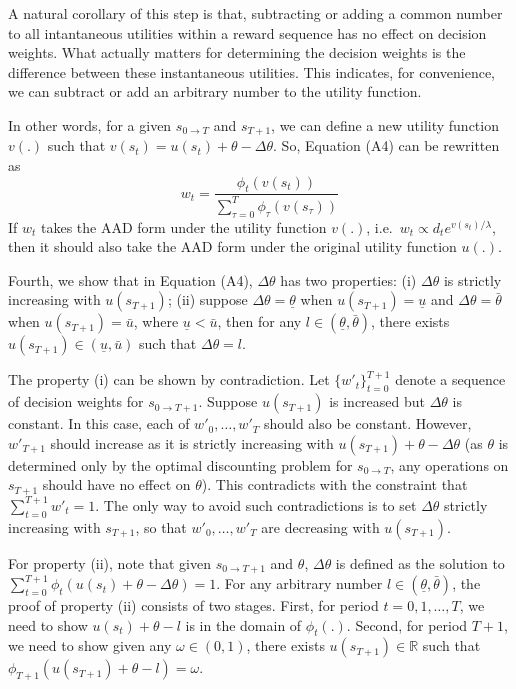 \documentclass[
  12pt,
]{article}
\begin{document}
A natural corollary of this step is that, subtracting or adding a common
number to all intantaneous utilities within a reward sequence has no
effect on decision weights. What actually matters for determining the
decision weights is the difference between these instantaneous
utilities. This indicates, for convenience, we can subtract or add an
arbitrary number to the utility function.

In other words, for a given \(s_{0\rightarrow T}\) and \(s_{T+1}\), we
can define a new utility function \(v(.)\) such that
\(v(s_t) = u(s_t) +\theta-\Delta \theta\). So, Equation (A4) can be
rewritten as\[\tag{A5}
w_t = \frac{\phi_t(v(s_t))}{\sum_{\tau=0}^{T}\phi_\tau(v(s_\tau))}
\]If \(w_t\) takes the AAD form under the utility function \(v(.)\),
i.e.~\(w_t \propto d_t e^{v(s_t)/\lambda}\), then it should also take
the AAD form under the original utility function \(u(.)\).

Fourth, we show that in Equation (A4), \(\Delta \theta\) has two
properties: (i) \(\Delta \theta\) is strictly increasing with
\(u(s_{T+1})\); (ii) suppose \(\Delta \theta = \underline{\theta}\) when
\(u(s_{T+1})=\underline{u}\) and \(\Delta\theta=\bar{\theta}\) when
\(u(s_{T+1})=\bar{u}\), where \(\underline{u}<\bar{u}\), then for any
\(l \in(\underline{\theta},\bar{\theta})\), there exists
\(u(s_{T+1})\in(\underline{u},\bar{u})\) such that
\(\Delta \theta = l\).

The property (i) can be shown by contradiction. Let
\(\{w'_t\}_{t=0}^{T+1}\) denote a sequence of decision weights for
\(s_{0\rightarrow T+1}\). Suppose \(u(s_{T+1})\) is increased but
\(\Delta \theta\) is constant. In this case, each of \(w'_0,…,w'_T\)
should also be constant. However, \(w'_{T+1}\) should increase as it is
strictly increasing with \(u(s_{T+1})+\theta-\Delta \theta\) (as
\(\theta\) is determined only by the optimal discounting problem for
\(s_{0\rightarrow T}\), any operations on \(s_{T+1}\) should have no
effect on \(\theta\)). This contradicts with the constraint that
\(\sum_{t=0}^{T+1} w'_t =1\). The only way to avoid such contradictions
is to set \(\Delta \theta\) strictly increasing with \(s_{T+1}\), so
that \(w'_0,…,w'_T\) are decreasing with \(u(s_{T+1})\).

For property (ii), note that given \(s_{0\rightarrow T+1}\) and
\(\theta\), \(\Delta\theta\) is defined as the solution to
\(\sum_{t=0}^{T+1} \phi_t(u(s_t)+\theta-\Delta\theta)=1\). For any
arbitrary number \(l\in(\underline{\theta},\bar{\theta})\), the proof of
property (ii) consists of two stages. First, for period \(t=0,1,…,T\),
we need to show \(u(s_t)+\theta-l\) is in the domain of \(\phi_t(.)\).
Second, for period \(T+1\), we need to show given any
\(\omega\in(0,1)\), there exists \(u(s_{T+1})\in \mathbb{R}\) such that
\(\phi_{T+1}(u(s_{T+1})+\theta-l)=\omega\).
\end{document}
